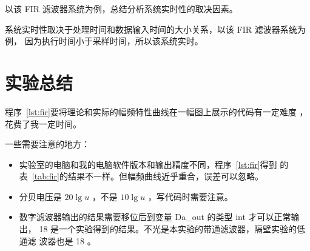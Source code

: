 \documentclass[../main]{subfiles}
\begin{document}
\begin{Exercise}
  以该 FIR 滤波器系统为例，总结分析系统实时性的取决因素。
\end{Exercise}

\begin{Answer}
  系统实时性取决于处理时间和数据输入时间的大小关系，以该 FIR 滤波器系统为例，
  因为执行时间小于采样时间，所以该系统实时。
\end{Answer}

\section{实验总结}%
\label{sec:\arabic{chapter}conclusion}

程序~\ref{lst:fir}要将理论和实际的幅频特性曲线在一幅图上展示的代码有一定难度
，花费了我一定时间。

一些需要注意的地方：

\begin{itemize}
  \item 实验室的电脑和我的电脑软件版本和输出精度不同，程序~\ref{lst:fir}得到
    的表~\ref{tab:fir}的结果不一样。但幅频曲线近乎重合，误差可以忽略。
  \item 分贝电压是 $20 \lg u$ ，不是 $10 \lg u$ ，写代码时需要注意。
  \item 数字滤波器输出的结果需要移位后到变量 Da\_out 的类型 int 才可以正常输
    出， 18 是一个实验得到的结果。不光是本实验的带通滤波器，隔壁实验的低通滤
    波器也是 18 。
\end{itemize}
\end{document}
